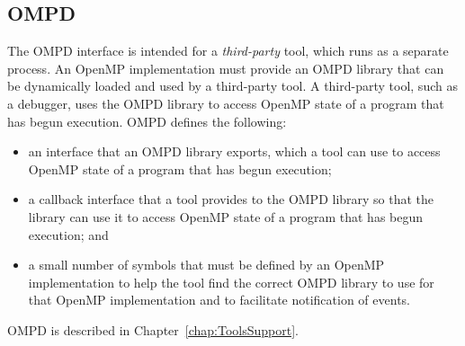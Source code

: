 \subsection{OMPD}

The OMPD interface is intended for a \emph{third-party} tool, which runs as a 
separate process. An OpenMP implementation must provide an OMPD
library that can be dynamically loaded and used by a third-party tool.
A third-party tool, such as a debugger, uses the OMPD library to access
OpenMP state of a program that has begun execution. OMPD defines the following:

\begin{itemize}
\item
  an interface that an OMPD library exports, which a
  tool can use to access OpenMP state of a program that has begun execution;
  \item
  a callback interface that a tool provides to the
  OMPD library so that the library can use it to access
 OpenMP state of a program that has begun execution; and
\item
  a small number of symbols that must be defined by an OpenMP implementation
  to help the tool find the correct OMPD library to use
  for that OpenMP implementation and to facilitate notification
  of events.
\end{itemize}
OMPD is described in Chapter~\ref{chap:ToolsSupport}.

